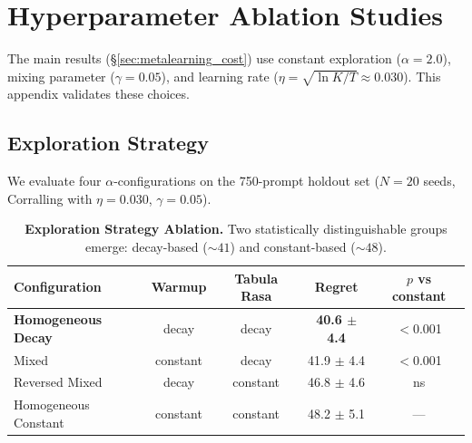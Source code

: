
\section{Hyperparameter Ablation Studies}
\label{app:ablations}

The main results (\S\ref{sec:metalearning_cost}) use constant
exploration ($\alpha{=}2.0$), mixing parameter ($\gamma{=}0.05$), and
learning rate ($\eta{=}\sqrt{\ln K/T}{\approx}0.030$).
This appendix validates these choices.


\subsection{Exploration Strategy}
\label{sec:alpha_ablation}

We evaluate four $\alpha$-configurations on the 750-prompt holdout set
($N{=}20$ seeds, Corralling with $\eta{=}0.030$, $\gamma{=}0.05$).

\begin{table}[h]
\centering
\caption{%
    \textbf{Exploration Strategy Ablation.}
    Two statistically distinguishable groups emerge:
    decay-based (${\sim}41$) and constant-based (${\sim}48$).
}
\label{tab:alpha_ablation}
\small
\begin{tabular}{@{}lcccc@{}}
\toprule
\textbf{Configuration} & \textbf{Warmup} & \textbf{Tabula Rasa} & \textbf{Regret} & \textbf{$p$ vs constant} \\
\midrule
\textbf{Homogeneous Decay} & decay & decay & \textbf{40.6 $\pm$ 4.4} & $<$0.001 \\
Mixed & constant & decay & 41.9 $\pm$ 4.4 & $<$0.001 \\
\midrule
Reversed Mixed & decay & constant & 46.8 $\pm$ 4.6 & ns \\
Homogeneous Constant & constant & constant & 48.2 $\pm$ 5.1 & --- \\
\bottomrule
\end{tabular}
\end{table}

